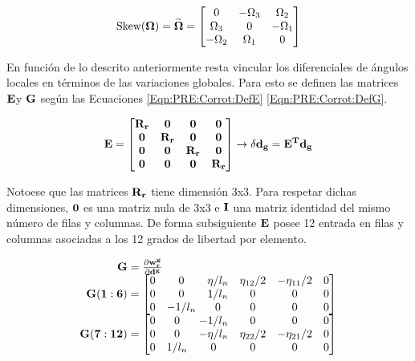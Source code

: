 \begin{equation}\label{eq:PRE:Skew}
	\text{Skew}(\bf{\Omega})=\widetilde{\bf{\Omega}}
	= 
	\begin{bmatrix}
		0 &-\Omega_3  &\Omega_2   \\ 
		\Omega_3&0  & -\Omega_1  \\ 
		-\Omega_2  & \Omega_1 & 0
	\end{bmatrix}
\end{equation}

En función de lo descrito anteriormente resta vincular los diferenciales de ángulos locales en términos de las variaciones globales. Para esto se definen las matrices $\bf{E} $y $\bf{G}$ según las Ecuaciones \eqref{Eqn:PRE:Corrot:DefE} \eqref{Eqn:PRE:Corrot:DefG}.

\begin{equation}\label{Eqn:PRE:Corrot:DefE}
	\bf{E}=\begin{bmatrix}
		\bf{R_r}& \bf{0}   & \bf{0}   & \bf{0} \\ 
		\bf{0}  & \bf{R_r} & \bf{0}   & \bf{0}\\ 
		\bf{0}  & \bf{0}   & \bf{R_r} & \bf{0} \\ 
		\bf{0}  & \bf{0}   & \bf{0}   & \bf{R_r}
	\end{bmatrix}\rightarrow \delta \bf{d_g}=E^T \bf{d_g}
\end{equation}

Notoese que las matrices $\bf{R}_r$ tiene dimensión 3x3. Para respetar dichas dimensiones, $\bf{0}$ es una matriz nula de 3x3 e $\bf{I}$ una matriz identidad del mismo número de filas y columnas. De forma subsiguiente $\bf{E}$ posee 12 entrada en filas y columnas asociadas a los 12 grados de libertad por elemento. 

\begin{equation}\label{Eqn:PRE:Corrot:DefG}
	\begin{array}{r@{}l}
		\bf{G}&{}=\frac{\partial \bf{w_r^g}}{\partial \bf{d}^g}\\
		\bf{G}(1:6)&{}=\begin{bmatrix}
			0 &  0      &  \eta/l_n &  \eta_{12}/2  &-\eta_{11}/2  &  0  \\ 
			0 &  0      &   1/l_n   &       0       &      0       &  0   \\ 
			0 & -1/l_n  &      0    &       0       &      0       &  0    
		\end{bmatrix}\\
		\bf{G}(7:12)&{}=\begin{bmatrix}
			0  &  0    &   -1/l_n   &      0      &     0        &    0 \\
			0  &  0     &-\eta/l_n  & \eta_{22}/2 &-\eta_{21}/2  &    0 \\
			0  &  1/l_n &       0   &      0      &     0        &    0 
		\end{bmatrix}
	\end{array}
\end{equation}


